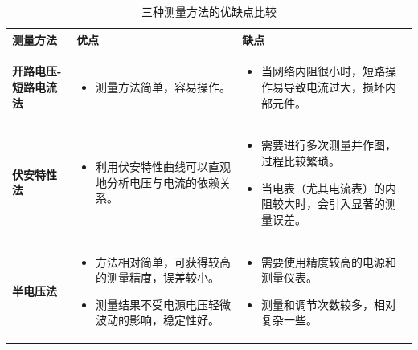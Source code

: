 \documentclass{Report} %
\begin{document}
\begin{table}[H]
    \centering
    \caption{三种测量方法的优缺点比较}
    \begin{tabularx}{\textwidth}{lXX}
        \toprule
        \textbf{测量方法} & \textbf{优点} & \textbf{缺点} \\
        \midrule
        \textbf{开路电压-短路电流法} &
        \begin{itemize}
            \item 测量方法简单，容易操作。
        \end{itemize} &
        \begin{itemize}
            \item 当网络内阻很小时，短路操作易导致电流过大，损坏内部元件。
        \end{itemize} \\
        \midrule
        \textbf{伏安特性法} &
        \begin{itemize}
            \item 利用伏安特性曲线可以直观地分析电压与电流的依赖关系。
        \end{itemize} &
        \begin{itemize}
            \item 需要进行多次测量并作图，过程比较繁琐。
            \item 当电表（尤其电流表）的内阻较大时，会引入显著的测量误差。
        \end{itemize} \\
        \midrule
        \textbf{半电压法} &
        \begin{itemize}
            \item 方法相对简单，可获得较高的测量精度，误差较小。
            \item 测量结果不受电源电压轻微波动的影响，稳定性好。
        \end{itemize} &
        \begin{itemize}
            \item 需要使用精度较高的电源和测量仪表。
            \item 测量和调节次数较多，相对复杂一些。
        \end{itemize} \\
        \bottomrule
    \end{tabularx}
\end{table}
\end{document}
